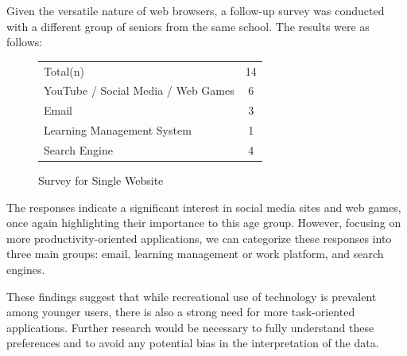 \documentclass[letterpaper,twocolumn,10pt]{article}
\begin{document}
Given the versatile nature of web browsers, a follow-up survey was conducted with a different group of seniors from the same school. The results were as follows:
\begin{figure}[h!]
    \centering
    \caption{Survey for Single Website}
    \begin{tabular}{lc}
    \rowcolor{gray!50}
    Total(n)                        & 14 \\
    YouTube / Social Media / Web Games                     & 6          \\
    Email & 3           \\
    Learning Management System & 1          \\
    Search Engine    & 4  
\end{tabular}
\end{figure}

The responses indicate a significant interest in social media sites and web games, once again highlighting their importance to this age group. However, focusing on more productivity-oriented applications, we can categorize these responses into three main groups: email, learning management or work platform, and search engines.

These findings suggest that while recreational use of technology is prevalent among younger users, there is also a strong need for more task-oriented applications. Further research would be necessary to fully understand these preferences and to avoid any potential bias in the interpretation of the data.

{\footnotesize 
}
\end{document}
